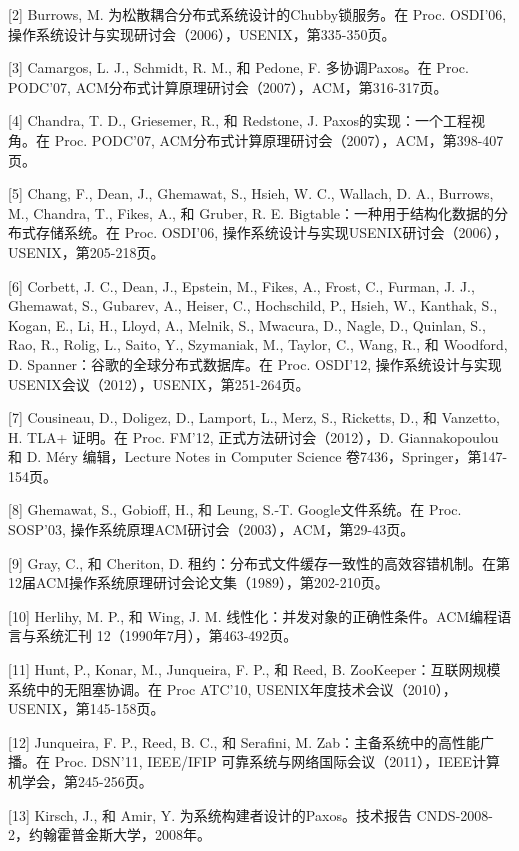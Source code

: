 \documentclass[12pt,a4paper]{report} %
\begin{document}
[2] Burrows, M. 为松散耦合分布式系统设计的Chubby锁服务。在 Proc. OSDI'06, 操作系统设计与实现研讨会（2006），USENIX，第335-350页。

[3] Camargos, L. J., Schmidt, R. M., 和 Pedone, F. 多协调Paxos。在 Proc. PODC'07, ACM分布式计算原理研讨会（2007），ACM，第316-317页。

[4] Chandra, T. D., Griesemer, R., 和 Redstone, J. Paxos的实现：一个工程视角。在 Proc. PODC'07, ACM分布式计算原理研讨会（2007），ACM，第398-407页。

[5] Chang, F., Dean, J., Ghemawat, S., Hsieh, W. C., Wallach, D. A., Burrows, M., Chandra, T., Fikes, A., 和 Gruber, R. E. Bigtable：一种用于结构化数据的分布式存储系统。在 Proc. OSDI'06, 操作系统设计与实现USENIX研讨会（2006），USENIX，第205-218页。

[6] Corbett, J. C., Dean, J., Epstein, M., Fikes, A., Frost, C., Furman, J. J., Ghemawat, S., Gubarev, A., Heiser, C., Hochschild, P., Hsieh, W., Kanthak, S., Kogan, E., Li, H., Lloyd, A., Melnik, S., Mwacura, D., Nagle, D., Quinlan, S., Rao, R., Rolig, L., Saito, Y., Szymaniak, M., Taylor, C., Wang, R., 和 Woodford, D. Spanner：谷歌的全球分布式数据库。在 Proc. OSDI'12, 操作系统设计与实现USENIX会议（2012），USENIX，第251-264页。

[7] Cousineau, D., Doligez, D., Lamport, L., Merz, S., Ricketts, D., 和 Vanzetto, H. TLA+ 证明。在 Proc. FM'12, 正式方法研讨会（2012），D. Giannakopoulou 和 D. Méry 编辑，Lecture Notes in Computer Science 卷7436，Springer，第147-154页。

[8] Ghemawat, S., Gobioff, H., 和 Leung, S.-T. Google文件系统。在 Proc. SOSP'03, 操作系统原理ACM研讨会（2003），ACM，第29-43页。

[9] Gray, C., 和 Cheriton, D. 租约：分布式文件缓存一致性的高效容错机制。在第12届ACM操作系统原理研讨会论文集（1989），第202-210页。

[10] Herlihy, M. P., 和 Wing, J. M. 线性化：并发对象的正确性条件。ACM编程语言与系统汇刊 12（1990年7月），第463-492页。

[11] Hunt, P., Konar, M., Junqueira, F. P., 和 Reed, B. ZooKeeper：互联网规模系统中的无阻塞协调。在 Proc ATC'10, USENIX年度技术会议（2010），USENIX，第145-158页。

[12] Junqueira, F. P., Reed, B. C., 和 Serafini, M. Zab：主备系统中的高性能广播。在 Proc. DSN'11, IEEE/IFIP 可靠系统与网络国际会议（2011），IEEE计算机学会，第245-256页。

[13] Kirsch, J., 和 Amir, Y. 为系统构建者设计的Paxos。技术报告 CNDS-2008-2，约翰霍普金斯大学，2008年。
\end{document}
